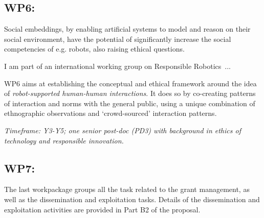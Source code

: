 \subsection{WP6: \textbf{\wpSix}}


Social embeddings, by enabling artificial systems to model and reason on their
social environment, have the potential of significantly increase the social
competencies of e.g. robots, also raising ethical questions.

I am part of an international working group on Responsible Robotics~...

WP6 aims at establishing the conceptual and ethical framework around the idea of
\emph{robot-supported human-human interactions}. It does so by co-creating
patterns of interaction and norms with the general public, using a unique
combination of ethnographic observations and `crowd-sourced' interaction
patterns.

\vspace{1em}
\noindent\emph{Timeframe: Y3-Y5; one senior post-doc (PD3)
with background in ethics of technology and responsible innovation.}


\subsection{WP7: \textbf{\wpSeven}}

The last workpackage groups all the task related to the grant management, as
well as the dissemination and exploitation tasks. Details of the dissemination
and exploitation activities are provided in Part B2 of the proposal.

\newpage

\printbibliography



